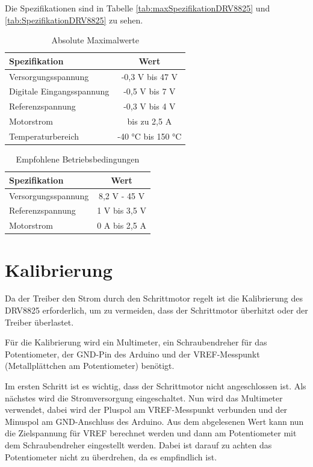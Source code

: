 Die Spezifikationen sind in Tabelle \autoref{tab:maxSpezifikationDRV8825} und \autoref{tab:SpezifikationDRV8825} zu sehen.

\begin{table}[htpb]
	\centering
	\begin{tabular}{|l|c|}
		\hline
		\textbf{Spezifikation} & \textbf{Wert} \\
		\hline
		Versorgungsspannung & -0,3 V bis 47 V \\
		Digitale Eingangsspannung & -0,5 V bis 7 V \\
		Referenzspannung & -0,3 V bis 4 V \\
		Motorstrom & bis zu 2,5 A \\
		Temperaturbereich & -40 °C bis 150 °C \\
		\hline
	\end{tabular}
	\caption{Absolute Maximalwerte \cite{DRV8825.2}}
	\label{tab:maxSpezifikationDRV8825}
\end{table}

\begin{table}[htpb]
	\centering
	\begin{tabular}{|l|c|}
		\hline
		\textbf{Spezifikation} & \textbf{Wert} \\
		\hline
		Versorgungsspannung & 8,2 V - 45 V \\
		Referenzspannung & 1 V bis 3,5 V \\
		Motorstrom & 0 A bis 2,5 A \\
		\hline
	\end{tabular}
	\caption{Empfohlene Betriebsbedingungen \cite{DRV8825.2}}
	\label{tab:SpezifikationDRV8825}
\end{table}

\section{Kalibrierung}

Da der Treiber den Strom durch den Schrittmotor regelt ist die Kalibrierung des DRV8825 erforderlich, um zu vermeiden, dass der Schrittmotor überhitzt oder der Treiber überlastet. 

Für die Kalibrierung wird ein Multimeter, ein Schraubendreher für das Potentiometer, der GND-Pin des Arduino und der VREF-Messpunkt (Metallplättchen am Potentiometer) benötigt.

Im ersten Schritt ist es wichtig, dass der Schrittmotor nicht angeschlossen ist. Als nächstes wird die Stromversorgung eingeschaltet. Nun wird das Multimeter verwendet, dabei wird der Pluspol am VREF-Messpunkt verbunden und der Minuspol am GND-Anschluss des Arduino. Aus dem abgelesenen Wert kann nun die Zielspannung für VREF berechnet werden und dann am Potentiometer mit dem Schraubendreher eingestellt werden. Dabei ist darauf zu achten das Potentiometer nicht zu überdrehen, da es empfindlich ist. 

